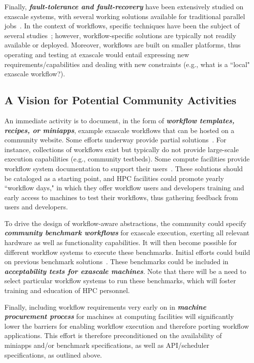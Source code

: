 Finally, \textbf{\emph{fault-tolerance and fault-recovery}} have been extensively studied on exascale systems, with several working solutions available for traditional parallel jobs~\cite{heldens2020landscape}. In the context of  workflows, specific techniques have been the subject of several studies~\cite{prathiba2017survey}; however, workflow-specific solutions are typically not readily available or deployed. Moreover, workflows are built on smaller platforms, thus operating and testing at exascale would entail expressing new requirements/capabilities and dealing with new constraints (e.g., what is a ``local" exascale workflow?).


\subsection{A Vision for Potential Community Activities}

An immediate activity is to document, in the form of \textbf{\emph{workflow templates, recipes, or miniapps}}, example exascale workflows that can be hosted on a community website. 
Some efforts underway provide partial solutions~\cite{ewels2020nf}. For instance, collections of workflows exist but typically do not provide large-scale execution capabilities (e.g., community testbeds). Some compute facilities provide workflow system documentation to support their users~\cite{nersc-workflows}. These solutions should be cataloged as a starting point, and HPC facilities could promote yearly ``workflow days," in which they offer workflow users and developers training and early access to machines to test their workflows, thus gathering feedback from users and developers.

To drive the design of workflow-aware abstractions, the community could specify \textbf{\emph{community benchmark workflows}} for exascale execution, exerting all relevant hardware as well as functionality capabilities. It will then become possible for different workflow systems to execute these benchmarks. Initial efforts could build on previous benchmark solutions~\cite{openebench, coleman2021wfcommons}. These benchmarks could be included in \textbf{\emph{acceptability tests for exascale machines}}. Note that there will be a need to select particular workflow systems to run these benchmarks, which will foster training and education of HPC personnel.

Finally, including workflow requirements very early on in \textbf{\emph{machine procurement process}} for machines at computing facilities will significantly lower the barriers for enabling workflow execution and therefore porting workflow applications. This effort is therefore preconditioned on the availability of miniapps and/or benchmark specifications, as well as API/scheduler specifications, as outlined above.
